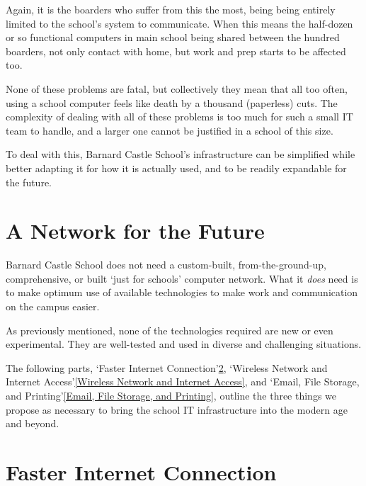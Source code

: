 \documentclass[a4paper,leqno,titlepage]{article}
\begin{document}
Again, it is the boarders who suffer from this the most, being being entirely
limited to the school's system to communicate. When this means the
half-dozen or so functional computers in main school being shared between the
hundred boarders, not only contact with home,
but work and prep starts to be affected too.


None of these problems are fatal, but collectively they mean that all too often,
using a school computer feels like death by a thousand (paperless) cuts.
The complexity of dealing with all of these problems is too much for such a
small IT team to handle, and a larger one cannot be justified in a school of
this size.


To deal with this, Barnard Castle School's infrastructure can be simplified
while better adapting it for how it is actually used, and to be
readily expandable for the future.



\break




\section{A Network for the Future}


Barnard Castle School does not need a custom-built, from-the-ground-up,
comprehensive, or built `just for schools' computer network.
What it \emph{does} need is to make optimum use of available technologies
to make work and communication on the campus easier.


As previously mentioned, none of the technologies required are new or even
experimental. They are well-tested and used in diverse and challenging
situations.

The following parts,
`Faster Internet Connection'\ref{Faster Internet Connection},
`Wireless Network and Internet Access'\ref{Wireless Network and Internet Access},
and `Email, File Storage, and Printing'\ref{Email, File Storage, and Printing},
outline the three things we propose as necessary to bring the school IT
infrastructure into the modern age and beyond.






\section{Faster Internet Connection}\label{Faster Internet Connection}
\end{document}

